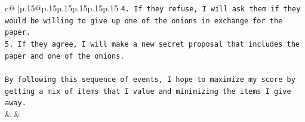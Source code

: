 \documentclass{article}
\begin{document}
{\begin{supertabular}{c@{$\;$}|p{.15\linewidth}@{}p{.15\linewidth}p{.15\linewidth}p{.15\linewidth}p{.15\linewidth}p{.15\linewidth}}
{{{\texttt{4. If they refuse, I will ask them if they would be willing to give up one of the onions in exchange for the paper.} \\
\texttt{5. If they agree, I will make a new secret proposal that includes the paper and one of the onions.} \\
\\ 
\texttt{By following this sequence of events, I hope to maximize my score by getting a mix of items that I value and minimizing the items I give away.} \\
            }
        }
    }
    & & \\ \\

\end{supertabular}
}
\end{document}
